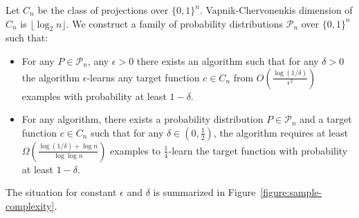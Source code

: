 \documentclass[10pt]{article}
\renewcommand{\P}{\mathcal{P}}
\begin{document}
Let $C_n$ be the class of projections over $\{0,1\}^n$. Vapnik-Chervonenkis
dimension of $C_n$ is $\lfloor \log_2 n \rfloor$. We construct a family of
probability distributions $\P_n$ over $\{0,1\}^n$ such that:

\begin{itemize}
\item For any $P \in \P_n$, any $\epsilon > 0$ there exists an algorithm such
that for any $\delta > 0$ the algorithm $\epsilon$-learns any target function $c
\in C_n$ from $O \left( \frac{\log(1/\delta)}{\epsilon^2} \right)$ examples with
probability at least $1-\delta$.

\item For any algorithm, there exists
a probability distribution $P \in \P_n$ and a target function $c \in C_n$
such that for any $\delta \in (0,\frac{1}{2})$, the algorithm requires
at least $\Omega(\frac{\log(1/\delta) + \log n}{\log \log n})$ examples to
$\frac{1}{4}$-learn the target function with probability at least $1-\delta$.
\end{itemize}
%
The situation for constant $\epsilon$ and $\delta$ is summarized in
Figure~\ref{figure:sample-complexity}.
\end{document}
